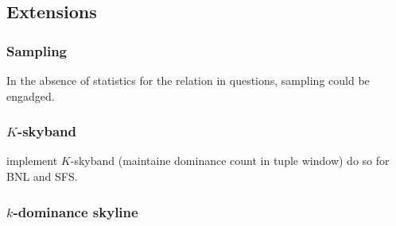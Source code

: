 \subsection{Extensions}

\subsubsection{Sampling}

In the absence of statistics for the relation in questions, sampling
could be engadged. 

\subsubsection{$K$-skyband}
implement $K$-skyband (maintaine dominance count in tuple window) do
so for BNL and SFS.

\subsubsection{$k$-dominance skyline}






